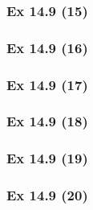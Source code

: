 \subsubsection{Ex 14.9 (15)}\label{sec:Ex_14.9.15}

\subsubsection{Ex 14.9 (16)}\label{sec:Ex_14.9.16}

\subsubsection{Ex 14.9 (17)}\label{sec:Ex_14.9.17}

\subsubsection{Ex 14.9 (18)}\label{sec:Ex_14.9.18}

\subsubsection{Ex 14.9 (19)}\label{sec:Ex_14.9.19}

\subsubsection{Ex 14.9 (20)}\label{sec:Ex_14.9.20}








